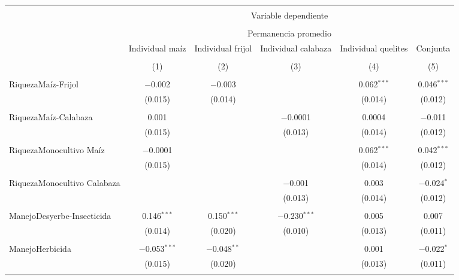 \documentclass[spanish,11pt]{article}
\begin{document}
\begin{table}[!htbp] \centering 
\begin{tabular}{@{\extracolsep{5pt}}lccccc} 
\\[-1.8ex]\hline 
\hline \\[-1.8ex] 
 & \multicolumn{5}{c}{Variable dependiente} \\ 
\cline{2-6} 
\\[-1.8ex] & \multicolumn{5}{c}{Permanencia promedio} \\ 
 & Individual maíz & Individual frijol & Individual calabaza & Individual quelites & Conjunta \\ 
\\[-1.8ex] & (1) & (2) & (3) & (4) & (5)\\ 
\hline \\[-1.8ex] 
 RiquezaMaíz-Frijol & $-$0.002 & $-$0.003 &  & 0.062$^{***}$ & 0.046$^{***}$ \\ 
  & (0.015) & (0.014) &  & (0.014) & (0.012) \\ 
  & & & & & \\ 
 RiquezaMaíz-Calabaza & 0.001 &  & $-$0.0001 & 0.0004 & $-$0.011 \\ 
  & (0.015) &  & (0.013) & (0.014) & (0.012) \\ 
  & & & & & \\ 
 RiquezaMonocultivo Maíz & $-$0.0001 &  &  & 0.062$^{***}$ & 0.042$^{***}$ \\ 
  & (0.015) &  &  & (0.014) & (0.012) \\ 
  & & & & & \\ 
 RiquezaMonocultivo Calabaza &  &  & $-$0.001 & 0.003 & $-$0.024$^{*}$ \\ 
  &  &  & (0.013) & (0.014) & (0.012) \\ 
  & & & & & \\ 
 ManejoDesyerbe-Insecticida & 0.146$^{***}$ & 0.150$^{***}$ & $-$0.230$^{***}$ & 0.005 & 0.007 \\ 
  & (0.014) & (0.020) & (0.010) & (0.013) & (0.011) \\ 
  & & & & & \\ 
 ManejoHerbicida & $-$0.053$^{***}$ & $-$0.048$^{**}$ &  & 0.001 & $-$0.022$^{*}$ \\ 
  & (0.015) & (0.020) &  & (0.013) & (0.011) \\ 
  & & & & & \\ 

\end{tabular}
\end{table}
\end{document}
